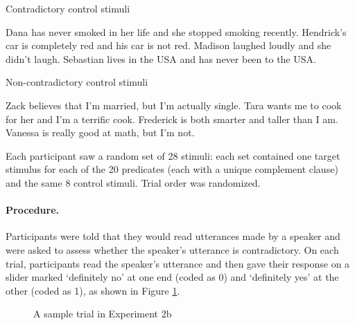 \documentclass[11pt,fleqn]{article}
\newcommand{\6}{\mbox{$[\hspace*{-.6mm}[$}}
\newcommand{\9}{\mbox{$]\hspace*{-.6mm}]$}}
\begin{document}
{\begin{exe}

\ex\label{control-bad} Contradictory control stimuli
\begin{xlist}
\ex Dana has never smoked in her life and she stopped smoking recently.
\ex Hendrick's car is completely red and his car is not red.
\ex Madison laughed loudly and she didn't laugh.
\ex Sebastian lives in the USA and has never been to the USA.
\end{xlist}

\ex\label{control-good} Non-contradictory control stimuli
\begin{xlist}
\ex Zack believes that I'm married, but I'm actually single.
\ex Tara wants me to cook for her and I'm a terrific cook.
\ex Frederick is both smarter and taller than I am.
\ex Vanessa is really good at math, but I'm not.
\end{xlist}

\end{exe}

Each participant saw a random set of 28 stimuli: each set contained one target stimulus for each of the 20 predicates (each with a unique complement clause) and the same 8 control stimuli. Trial order was randomized.


\paragraph{Procedure.} Participants were told that they would read utterances made by a speaker and were asked to assess whether the speaker's utterance is contradictory. On each trial, participants read the speaker's utterance and then gave their response on a slider marked `definitely no' at one end (coded as 0) and `definitely yes' at the other (coded as 1), as shown in Figure \ref{f-trial-exp2}.

\begin{figure}[h!]
\begin{center}
\end{center}
\caption{A sample trial in Experiment 2b}\label{f-trial-exp2}
\end{figure}

}
\end{document}
